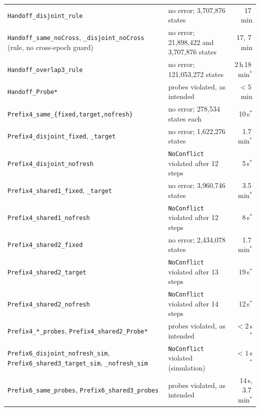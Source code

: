 \documentclass[conference]{IEEEtran}
\begin{document}
\begin{table}[t]
\begin{tabularx}{\textwidth}{@{}>{\raggedright\arraybackslash}p{}Yr@{}}
\texttt{Handoff\_\allowbreak{}disjoint\_\allowbreak{}rule} & no error; 3,707,876 states & 17\,min\\
\texttt{Handoff\_\allowbreak{}same\_\allowbreak{}noCross},\allowbreak{} \texttt{\_\allowbreak{}disjoint\_\allowbreak{}noCross} (rule,\allowbreak{} no cross-epoch guard) & no error; 21,898,422 and 3,707,876 states & 17, 7\,min\\
\texttt{Handoff\_\allowbreak{}overlap3\_\allowbreak{}rule} & no error; 121,053,272 states & 2\,h\,18\,min$^*$\\
\texttt{Handoff\_\allowbreak{}Probe*} & probes violated, as intended & $<5$\,min\\
\midrule
\texttt{Prefix4\_\allowbreak{}same\_\allowbreak{}\{fixed,\allowbreak{}target,\allowbreak{}nofresh\}} & no error; 278,534 states each & 10\,s$^*$\\
\texttt{Prefix4\_\allowbreak{}disjoint\_\allowbreak{}fixed},\allowbreak{} \texttt{\_\allowbreak{}target} & no error; 1,622,276 states & 1.7\,min$^*$\\
\texttt{Prefix4\_\allowbreak{}disjoint\_\allowbreak{}nofresh} & \texttt{NoConflict} violated after 12 steps & 5\,s$^*$\\
\texttt{Prefix4\_\allowbreak{}shared1\_\allowbreak{}fixed},\allowbreak{} \texttt{\_\allowbreak{}target} & no error; 3,960,746 states & 3.5\,min$^*$\\
\texttt{Prefix4\_\allowbreak{}shared1\_\allowbreak{}nofresh} & \texttt{NoConflict} violated after 12 steps & 8\,s$^*$\\
\texttt{Prefix4\_\allowbreak{}shared2\_\allowbreak{}fixed} & no error; 2,434,078 states & 1.7\,min$^*$\\
\texttt{Prefix4\_\allowbreak{}shared2\_\allowbreak{}target} & \texttt{NoConflict} violated after 13 steps & 19\,s$^*$\\
\texttt{Prefix4\_\allowbreak{}shared2\_\allowbreak{}nofresh} & \texttt{NoConflict} violated after 14 steps & 12\,s$^*$\\
\texttt{Prefix4\_\allowbreak{}*\_\allowbreak{}probes},\allowbreak{} \texttt{Prefix4\_\allowbreak{}shared2\_\allowbreak{}Probe*} & probes violated, as intended & $<2$\,s$^*$\\
\texttt{Prefix6\_\allowbreak{}disjoint\_\allowbreak{}nofresh\_\allowbreak{}sim},\allowbreak{} \texttt{Prefix6\_\allowbreak{}shared3\_\allowbreak{}target\_\allowbreak{}sim},\allowbreak{} \texttt{\_\allowbreak{}nofresh\_\allowbreak{}sim} & \texttt{NoConflict} violated (simulation) & $<1$\,s$^*$\\
\texttt{Prefix6\_\allowbreak{}same\_\allowbreak{}probes},\allowbreak{} \texttt{Prefix6\_\allowbreak{}shared3\_\allowbreak{}probes} & probes violated, as intended & 14\,s, 3.7\,min$^*$\\

\end{tabularx}
\end{table}
\end{document}

